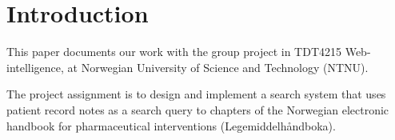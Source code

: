 \chapter{Introduction}
\label{cha:Introduction}

This paper documents our work with the group project in TDT4215
Web-intelligence, at Norwegian University of Science and Technology (NTNU).

The project assignment is to design and implement a search system that uses
patient record notes as a search query to chapters of the Norwegian electronic
handbook for pharmaceutical interventions (Legemiddelhåndboka).

